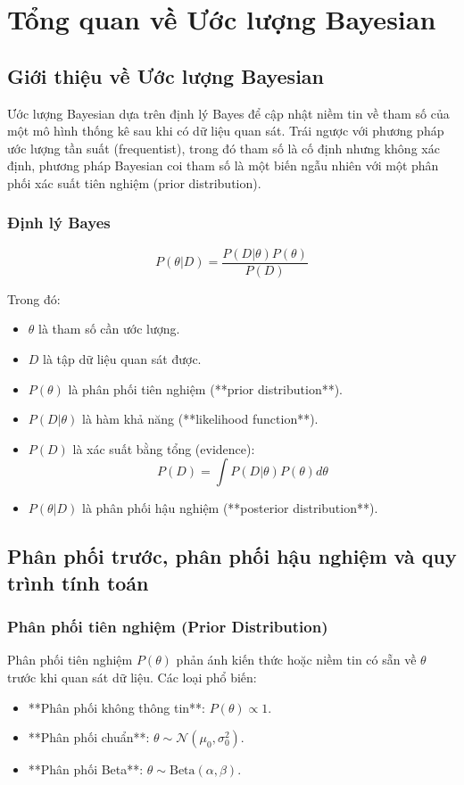 \chapter{Tổng quan về Ước lượng Bayesian}
\section{Giới thiệu về Ước lượng Bayesian}
Ước lượng Bayesian dựa trên định lý Bayes để cập nhật niềm tin về tham số của một mô hình thống kê sau khi có dữ liệu quan sát. Trái ngược với phương pháp ước lượng tần suất (frequentist), trong đó tham số là cố định nhưng không xác định, phương pháp Bayesian coi tham số là một biến ngẫu nhiên với một phân phối xác suất tiên nghiệm (prior distribution).

\subsection{Định lý Bayes}
\begin{equation}
P(\theta | D) = \frac{P(D | \theta) P(\theta)}{P(D)}
\end{equation}

Trong đó:
\begin{itemize}
    \item $\theta$ là tham số cần ước lượng.
    \item $D$ là tập dữ liệu quan sát được.
    \item $P(\theta)$ là phân phối tiên nghiệm (**prior distribution**).
    \item $P(D | \theta)$ là hàm khả năng (**likelihood function**).
    \item $P(D)$ là xác suất bằng tổng (evidence):
    \begin{equation}
    P(D) = \int P(D | \theta) P(\theta) d\theta
    \end{equation}
    \item $P(\theta | D)$ là phân phối hậu nghiệm (**posterior distribution**).
\end{itemize}

\section{Phân phối trước, phân phối hậu nghiệm và quy trình tính toán}
\subsection{Phân phối tiên nghiệm (Prior Distribution)}
Phân phối tiên nghiệm $P(\theta)$ phản ánh kiến thức hoặc niềm tin có sẵn về $\theta$ trước khi quan sát dữ liệu. Các loại phổ biến:
\begin{itemize}
    \item **Phân phối không thông tin**: $P(\theta) \propto 1$.
    \item **Phân phối chuẩn**: $\theta \sim \mathcal{N}(\mu_0, \sigma_0^2)$.
    \item **Phân phối Beta**: $\theta \sim \text{Beta}(\alpha, \beta)$.
\end{itemize}

